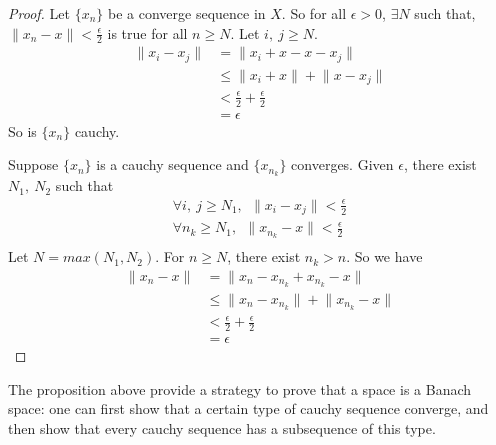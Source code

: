 \documentclass[lang=en, 12pt]{elegantbook}
\begin{document}
        \begin{proof}
            Let $\{x_n\}$ be a converge sequence in $X$. 
        So for all $\epsilon > 0$, $\exists N$ such that,
        $\lVert x_n - x\rVert <\frac{\epsilon}{2}$ is true for all $n\geq N$.
        Let $i , \ j \geq N$. 
        \begin{equation*}
            \begin{aligned}
                \lVert x_i - x_j \rVert &= \lVert x_i +x - x- x_j \rVert\\
                &\leq\lVert x_i +x  \rVert+\lVert x- x_j \rVert\\
                &< \frac{\epsilon}{2} + \frac{\epsilon}{2}\\
                &= \epsilon 
            \end{aligned}
        \end{equation*}
        So is $\{x_n\}$ cauchy.\par 
            Suppose $\{x_n\}$ is a cauchy sequence and $\{x_{n_k}\}$ converges.
        Given $\epsilon$, there exist $N_1, \ N_2$ such that 
        \begin{equation*}
            \begin{aligned}
                \forall i, \ j\geq N_1, \ \ \lVert x_i - x_j \rVert < \frac{\epsilon}{2} \\
                \forall n_k \geq N_1, \ \ \lVert x_{n_k} - x \rVert < \frac{\epsilon}{2} \\
            \end{aligned}
        \end{equation*}
        Let $N = max( N_1 , N_2)$. For $n \geq N$, there exist $n_k > n$. So we have 
        \begin{equation*}
            \begin{aligned}
                \lVert x_n - x \rVert &= \lVert x_n - x_{n_k} + x_{n_k}- x \rVert\\
                &\leq \lVert x_n - x_{n_k} \rVert+\lVert x_{n_k}- x \rVert\\
                &< \frac{\epsilon}{2} + \frac{\epsilon}{2}\\
                &= \epsilon
            \end{aligned}
        \end{equation*}
        \end{proof}
        The proposition above provide a strategy to prove that a space is a Banach 
    space: one can first show that a certain type of cauchy sequence converge, and 
    then show that every cauchy sequence has a subsequence of this type. 
\end{document}
